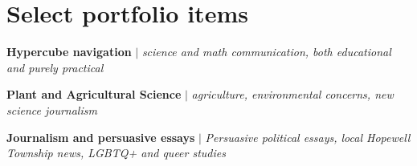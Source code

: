 \section{Select portfolio items}
\resumeSubHeadingListStart

    \resumeProjectHeading
    {\textbf{Hypercube navigation} $|$ \emph{science and math communication, both educational and purely practical}}    {}

    \resumeProjectHeading
    {\textbf{Plant and Agricultural Science} $|$ \emph{agriculture, environmental concerns, new science journalism}}{}

    \resumeProjectHeading
    {\textbf{Journalism and persuasive essays} $|$ \emph{Persuasive political essays, local Hopewell Township news, LGBTQ+ and queer studies}}{}


\resumeSubHeadingListEnd